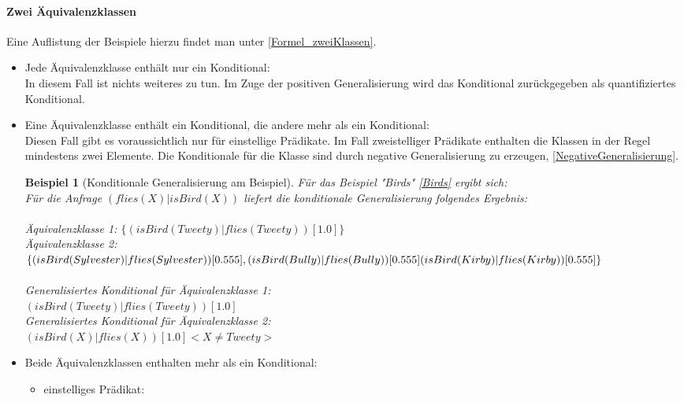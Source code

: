 \documentclass[a4paper, 11pt]{book}
\newtheorem{Bsp}{Beispiel}[section]
\begin{document}
\paragraph{Zwei Äquivalenzklassen}
Eine Auflistung der Beispiele hierzu findet man unter \ref{Formel_zweiKlassen}.
\begin{itemize}
	\item Jede Äquivalenzklasse enthält nur ein Konditional:\\
	In diesem Fall ist nichts weiteres zu tun. Im Zuge der positiven Generalisierung wird das Konditional zurückgegeben als quantifiziertes Konditional.
	\item Eine Äquivalenzklasse enthält ein Konditional, die andere mehr als ein Konditional:\\ %
	Diesen Fall gibt es voraussichtlich nur für einstellige Prädikate. Im Fall zweistelliger Prädikate enthalten die Klassen in der Regel mindestens zwei Elemente.  Die Konditionale für die Klasse sind durch negative Generalisierung zu erzeugen, \ref{NegativeGeneralisierung}. 
	\begin{Bsp}[Konditionale Generalisierung am Beispiel]
	Für das Beispiel "{}Birds"{} \ref{Birds} ergibt sich:\\
	Für die Anfrage $ (flies(X) | isBird(X)) $ liefert die konditionale Generalisierung folgendes Ergebnis:\\
	\\
	Äquivalenzklasse 1: $ \{(isBird(Tweety)|flies(Tweety))[1.0]\} $\\
	Äquivalenzklasse 2: $ \{(isBird(Sylvester)|flies(Sylvester))[0.555],\\ (isBird(Bully)|flies(Bully))[0.555] (isBird(Kirby)|flies(Kirby))[0.555] \}  $\\
	\\
	Generalisiertes Konditional für Äquivalenzklasse 1:\\ $ (isBird(Tweety)|flies(Tweety))[1.0]$\\
	Generalisiertes Konditional für Äquivalenzklasse 2:\\ $ (isBird(X)|flies(X))[1.0] <X \neq Tweety>$\\
	\end{Bsp}
	\item Beide Äquivalenzklassen enthalten mehr als ein Konditional:\\
	\begin{itemize}
		\item einstelliges Prädikat:\\

\end{itemize}
\end{itemize}
\end{document}
